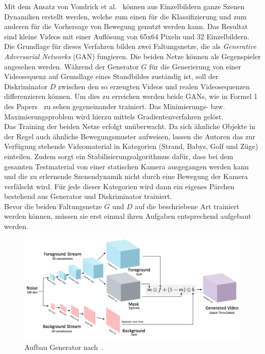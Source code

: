 \documentclass[times, 12pt,twocolumn]{article}
\begin{document}
 \label{sec:Vondrick}
Mit dem Ansatz von Vondrick et al.~\cite{VondrickPT16} können aus Einzelbildern ganze Szenen Dynamiken erstellt werden, welche zum einen für die Klassifizierung und zum anderen für die Vorhersage von Bewegung genutzt werden kann. Das Resultat sind kleine Videos mit einer Auflösung von 65x64 Pixeln und 32 Einzelbildern. \\
Die Grundlage für dieses Verfahren bilden zwei Faltungsnetze, die als \textit{Generative Adversarial Networks} (GAN) \cite{NIPS2014_5423} fungieren. Die beiden Netze können als Gegenspieler angesehen werden. Während der Generator $G$ für die Generierung von einer Videosequenz auf Grundlage eines Standbildes zuständig ist, soll der Diskriminator $D$ zwischen den so erzeugten Videos und realen Videosequenzen differenzieren können. Um dies zu erreichen werden beide GANs, wie in Formel 1 des Papers~\cite{VondrickPT16} zu sehen gegeneinander trainiert. Das Minimierungs- bzw. Maximierungsproblem wird hierzu mittels Gradientenverfahren gelöst. \\
Das Training der beiden Netze erfolgt unüberwacht. Da sich ähnliche Objekte in der Regel auch ähnliche Bewegungsmuster aufweisen, lassen die Autoren das zur Verfügung stehende Videomaterial in Kategorien (Strand, Babys, Golf und Züge) einteilen. Zudem sorgt ein Stabilisierungsalgorithmus dafür, dass bei dem gesamten Testmaterial von einer statischen Kamera ausgegangen werden kann und die zu erlernende Szenendynamik nicht durch eine Bewegung der Kamera verfälscht wird. Für jede dieser Kategorien wird dann ein eigenes Pärchen bestehend aus Generator und Diskriminator trainiert. \\
Bevor die beiden Faltungsnetze $G$ und $D$ auf die beschriebene Art trainiert werden können, müssen sie erst einmal ihren Aufgaben entsprechend aufgebaut werden. \\
\begin{figure}
	\flushleft
	\includegraphics[width=\columnwidth]{Bilder/generator2.jpg}
	\caption{Aufbau Generator nach~\cite{VondrickPT16}.}
	\label{fig:generator}
\end{figure}
\end{document}
